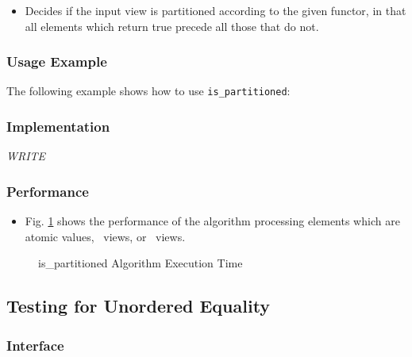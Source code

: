 \begin{itemize}
\item
Decides if the input view is partitioned according to the given functor, in that all elements which return true precede all those that do not. 
\end{itemize}

\subsubsection{Usage Example} %

The following example shows how to use \texttt{is\_partitioned}:

 
\subsubsection{Implementation} %

\textit{WRITE}

\subsubsection{Performance} %

\begin{itemize}
\item
Fig. \ref{fig:is-part-alg-exec-exper}
shows the performance of the algorithm processing
elements which are atomic values, \stl\ views, or \stapl\ views.
\end{itemize}

\begin{figure}[p]
\caption{is\_partitioned Algorithm Execution Time}
\label{fig:is-part-alg-exec-exper}
\end{figure}

 
\subsection{Testing for Unordered Equality} \label{sec-sumry-is_perm}

\subsubsection{Interface} %


